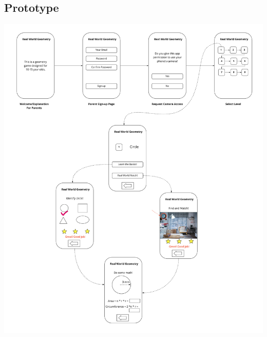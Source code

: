 \documentclass[manuscript, nonacm]{acmart}
\begin{document}
\begin{appendices}
  \section{Prototype}
  \label{appendix:prototype}
  \includegraphics[width=\textwidth]{prototype.jpg}

\end{appendices}
\end{document}
